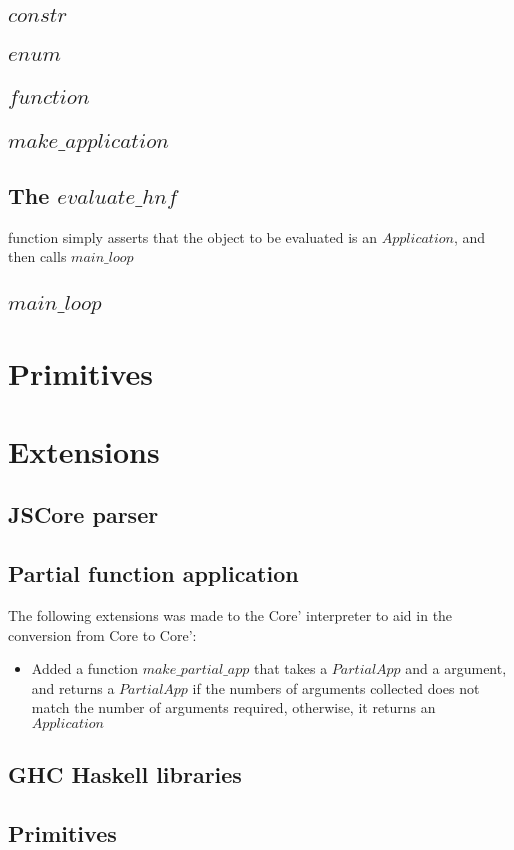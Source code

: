 \subsection{$constr$}

\subsection{$enum$}

\subsection{$function$}


\subsection{$make\_application$}


\subsection{The $evaluate\_hnf$} function simply asserts that the object to be evaluated
is an $Application$, and then calls $main\_loop$

\subsection{$main\_loop$}

\section{Primitives}




\section{Extensions}

\subsection{JSCore parser}

\subsection{Partial function application}

The following extensions was made to the Core' interpreter to aid in the conversion from
Core to Core':

\begin{itemize}
\item Added a function $make\_partial\_app$ that takes a $PartialApp$ and a argument, and returns
a $PartialApp$ if the numbers of arguments collected does not match the number of arguments required,
otherwise, it returns an $Application$
\end{itemize}


\subsection{GHC Haskell libraries}



\subsection{Primitives}


